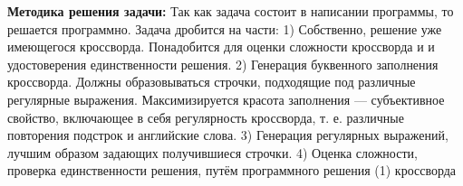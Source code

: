 \documentclass[12pt]{article}
\begin{document}
\textbf{ Методика решения задачи: }
Так как задача состоит в написании программы, то решается программно. Задача дробится на части:
1) Собственно, решение уже имеющегося кроссворда. Понадобится для оценки сложности кроссворда и и удостоверения единственности решения.
2) Генерация буквенного заполнения кроссворда. Должны образовываться строчки, подходящие под различные регулярные выражения. Максимизируется красота заполнения — субъективное свойство, включающее в себя регулярность кроссворда, т. е. различные повторения подстрок и английские слова.
3) Генерация регулярных выражений, лучшим образом задающих получившиеся строчки.
4) Оценка сложности, проверка единственности решения, путём программного решения (1) кроссворда

    \newpage %

    \newpage %

    \newpage %

    \newpage %
    

    \newpage %


    

        
\end{document}
